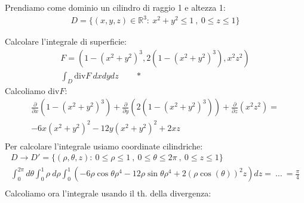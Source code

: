 \documentclass[a4paper, oneside]{article}
\begin{document}
\begin{example}
  Prendiamo come dominio un cilindro di raggio 1 e altezza 1:
  \begin{gather*}
    D = \{(x,y,z) \in \mathbb{R}^3: \ x^2 + y^2 \leq 1 \ , \ 0 \leq z \leq 1 \}
  \end{gather*}
  \begin{center}
  \end{center}
  Calcolare l'integrale di superficie:
  \begin{gather*}
    F = \left( 1 - (x^2+y^2)^3 , 2(1-(x^2+y^2)^3) , x^2z^2 \right)\\
    \int_D \text{div}F \ dxdydz \qquad \boxed{*}
  \end{gather*}
  Calcoliamo div$F$:
  \begin{gather*}
    \frac{\partial }{\partial x} \left( 1- (x^2+y^2)^3 \right) + \frac{\partial }{\partial y} \left( 2(1-(x^2+y^2)^3) \right) + \frac{\partial }{\partial z} \left( x^2z^2 \right) = \\
    -6x(x^2+y^2)^2 - 12y(x^2+y^2)^2 + 2xz \\
    \end{gather*}
    Per calcolare l'integrale usiamo coordinate cilindriche:
    \begin{gather*}
      D \to D' = \{(\rho,\theta,z): \ 0 \leq \rho \leq 1 \ , \ 0 \leq \theta \leq 2\pi \ , \ 0 \leq z \leq 1 \} \\
      \int_0^{2\pi} d\theta \int_0^1 \rho \ d\rho \int_0^1 \left( -6\rho \cos\theta \rho^4 - 12 \rho \sin\theta \rho^4 + 2 (\rho\cos(\theta))^2 z \right) dz = \ \dots \ = \frac{\pi}{4}\\
    \end{gather*}
    Calcoliamo ora l'integrale \fbox{*} usando il th. della divergenza:

\end{example}
\end{document}
